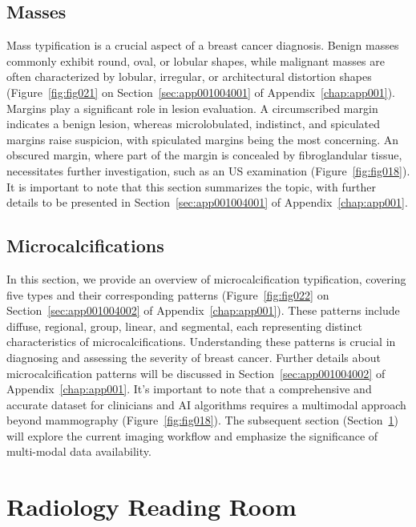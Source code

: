 \subsection{Masses}
\label{sec:chap002004001}

Mass typification is a crucial aspect of a breast cancer diagnosis.
Benign masses commonly exhibit round, oval, or lobular shapes, while malignant masses are often characterized by lobular, irregular, or architectural distortion shapes (Figure~\ref{fig:fig021} on Section~\ref{sec:app001004001} of Appendix~\ref{chap:app001}).
Margins play a significant role in lesion evaluation.
A circumscribed margin indicates a benign lesion, whereas microlobulated, indistinct, and spiculated margins raise suspicion, with spiculated margins being the most concerning.
An obscured margin, where part of the margin is concealed by fibroglandular tissue, necessitates further investigation, such as an \ac{US} examination (Figure~\ref{fig:fig018}).
It is important to note that this section summarizes the topic, with further details to be presented in Section~\ref{sec:app001004001} of Appendix~\ref{chap:app001}.

\subsection{Microcalcifications}
\label{sec:chap002004002}

In this section, we provide an overview of microcalcification typification, covering five types and their corresponding patterns (Figure~\ref{fig:fig022} on Section~\ref{sec:app001004002} of Appendix~\ref{chap:app001}).
These patterns include diffuse, regional, group, linear, and segmental, each representing distinct characteristics of microcalcifications.
Understanding these patterns is crucial in diagnosing and assessing the severity of breast cancer.
Further details about microcalcification patterns will be discussed in Section~\ref{sec:app001004002} of Appendix~\ref{chap:app001}.
It's important to note that a comprehensive and accurate dataset for clinicians and \ac{AI} algorithms requires a multimodal approach beyond mammography (Figure~\ref{fig:fig018}).
The subsequent section (Section~\ref{sec:chap002005}) will explore the current imaging workflow and emphasize the significance of multi-modal data availability.

\section{Radiology Reading Room}
\label{sec:chap002005}

